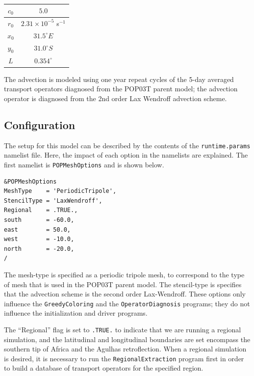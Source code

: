 \documentclass{softwaremanual}
\begin{document}
\begin{table}
\caption{} \label{table:agulhasSourceParameters}
\begin{center}
\begin{tabular}{ | c | c |}
\hline
$c_0$ & $5.0$ \\
\hline
$r_0$ & $2.31 \times 10^{-5}$ s$^{-1}$\\
\hline
$x_0$ & $31.5^\circ E$\\
\hline
$y_0$ & $31.0^\circ S$\\
\hline
$L$ & $0.354^\circ$ \\
\hline
\end{tabular}
\end{center}
\end{table}

The advection is modeled using one year repeat cycles of the 5-day averaged transport operators diagnosed from the POP03T parent model; the advection operator is diagnosed from the 2nd order Lax Wendroff advection scheme. 

\subsection{Configuration}
The setup for this model can be described by the contents of the \texttt{runtime.params} namelist file. Here, the impact of each option in the namelists are explained. The first namelist is \texttt{POPMeshOptions} and is shown below.

\begin{verbatim}
&POPMeshOptions
MeshType    = 'PeriodicTripole',
StencilType = 'LaxWendroff',
Regional    = .TRUE.,
south       = -60.0,
east        = 50.0,
west        = -10.0,
north       = -20.0,  
/
\end{verbatim}
The mesh-type is specified as a periodic tripole mesh, to correspond to the type of mesh that is used in the POP03T parent model. The stencil-type is specifies that the advection scheme is the second order Lax-Wendroff. These options only influence the \texttt{GreedyColoring} and the \texttt{OperatorDiagnosis} programs; they do not influence the initialization and driver programs.

The ``Regional'' flag is set to \texttt{.TRUE.} to indicate that we are running a regional simulation, and the latitudinal and longitudinal boundaries are set encompass the southern tip of Africa and the Agulhas retroflection. When a regional simulation is desired, it is necessary to run the \texttt{RegionalExtraction} program first in order to build a database of transport operators for the specified region.
\end{document}
